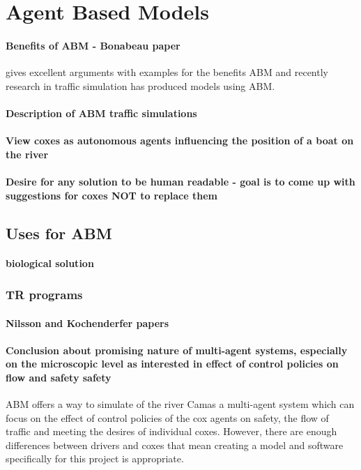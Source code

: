     \section{Agent Based Models}

    \paragraph{Benefits of ABM - Bonabeau paper}
      \textcite{Bonabeau2002} gives excellent arguments with examples for the benefits ABM and recently research in traffic simulation has produced models using ABM.
      
      \paragraph{Description of ABM traffic simulations}

      \paragraph{View coxes as autonomous agents influencing the position of a boat on the river}
      \paragraph{Desire for any solution to be human readable - goal is to come up with suggestions for coxes NOT to replace them}
      \subsection{Uses for ABM}
        \paragraph{biological solution}
        \subsubsection{TR programs}
          \paragraph{Nilsson and Kochenderfer papers}
          
    \paragraph{Conclusion about promising nature of multi-agent systems, especially on the  microscopic level as interested in effect of control policies on flow and safety safety}
    ABM offers a way to simulate of the river Camas a multi-agent system which can focus on the effect of control policies of the cox agents on safety, the flow of traffic and meeting the desires of individual coxes. However, there are enough differences between drivers and coxes that mean creating a model and software specifically for this project is appropriate.
    
